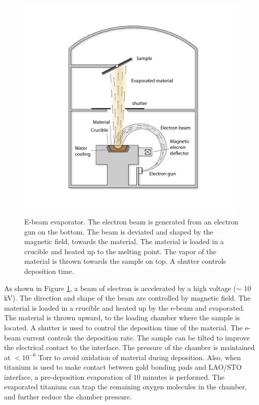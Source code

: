 \documentclass[pdflatex, sectionletters, 12pt, final, phd]{pittetd}    %
\begin{document}
\begin{figure}[p]
	\centering
	\includegraphics[width=1.0\textwidth]{Drawing/Ebeam.pdf}
	\caption[E-beam evaporator]{E-beam evaporator. The electron beam is generated from an electron gun on the bottom. The beam is deviated and shaped by the magnetic field, towards the material. The material is loaded in a crucible and heated up to the melting point. The vapor of the material is thrown towards the sample on top. A shutter controls deposition time.}
	\label{FIG:Ebeam}
\end{figure}

As shown in Figure \ref{FIG:Ebeam}, a beam of electron is accelerated by a high voltage ($\sim$ 10 kV). The direction and shape of the beam are controlled by magnetic field. The material is loaded in a crucible and heated up by the e-beam and evaporated. The material is thrown upward, to the loading chamber where the sample is located. A shutter is used to control the deposition time of the material. The e-beam current controls the deposition rate. The sample can be tilted to improve the electrical contact to the interface. The pressure of the chamber is maintained at $< 10^{-6}$ Torr to avoid oxidation of material during deposition. Also, when titanium is used to make contact between gold bonding pads and LAO/STO interface, a pre-deposition evaporation of 10 minutes is performed. The evaporated titanium can trap the remaining oxygen molecules in the chamber, and further reduce the chamber pressure.
\end{document}
